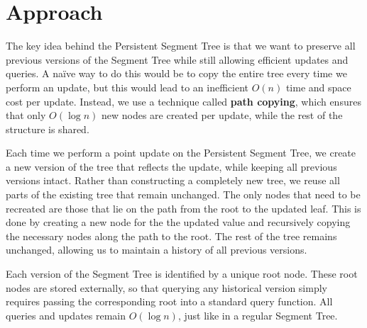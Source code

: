 \documentclass{fairmeta}
\numberwithin{equation}{section}
\begin{document}
\section{Approach}\label{section:approach}

The key idea behind the Persistent Segment Tree is that we want to preserve all previous versions of the Segment Tree while still allowing efficient updates and queries. A naïve way to do this would be to copy the entire tree every time we perform an update, but this would lead to an inefficient $O(n)$ time and space cost per update. Instead, we use a technique called \textbf{path copying}, which ensures that only $O(\log n)$ new nodes are created per update, while the rest of the structure is shared.

Each time we perform a point update on the Persistent Segment Tree, we create a new version of the tree that reflects the update, while keeping all previous versions intact. Rather than constructing a completely new tree, we reuse all parts of the existing tree that remain unchanged. The only nodes that need to be recreated are those that lie on the path from the root to the updated leaf. This is done by creating a new node for the the updated value and recursively copying the necessary nodes along the path to the root. The rest of the tree remains unchanged, allowing us to maintain a history of all previous versions.

Each version of the Segment Tree is identified by a unique root node. These root nodes are stored externally, so that querying any historical version simply requires passing the corresponding root into a standard query function. All queries and updates remain $O(\log n)$, just like in a regular Segment Tree.
\end{document}

